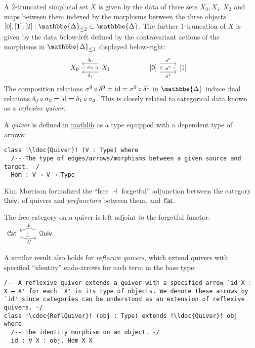 \documentclass[a4paper,UKenglish,cleveref, autoref, thm-restate]{lipics-v2021}
\newcommand{\id}{\textup{id}}
\newcommand{\cat}[1]{\textup{\textsf{#1}}}%
\newcommand{\1}{\mathbbe{1}}
\newcommand{\2}{\mathbbe{2}}
\newcommand{\3}{\mathbbe{3}}
\newcommand{\DDelta}{\mathbbe{\Delta}}
\newcommand{\Cat}{\mathcal{C}{\kern-.75pt}\cat{at}}
\newcommand{\Quiv}{\mathcal{Q}\cat{uiv}}
\newcommand{\libmathlib}{\href{https://github.com/leanprover-community/mathlib}{\textsf{mathlib}}}
\newcommand{\ldoc}[2][]{\href{https://leanprover-community.github.io/mathlib4_docs/find/?pattern=#1#2\#doc}{\texttt{#2}}}
\newcommand{\cdoc}[2][]{\href{https://leanprover-community.github.io/mathlib4_docs/find/?pattern=CategoryTheory.#1#2\#doc}{\texttt{#2}}}
\begin{document}
A 2-truncated simplicial set $X$ is given by the data of three sets $X_0, X_1, X_2$ and maps between them indexed by the morphisms between the three objects $[0], [1], [2] : \DDelta_{\leq 2} \subset \DDelta$. The further 1-truncation of $X$  is given by the data below-left defined by the contravariant actions of the morphisms in $\DDelta_{\leq 1}$ displayed below-right:
\begin{equation}\label{eq:underlying-refl-quiv} \begin{tikzcd} X_0 \arrow[r, "\sigma_0" description] & X_1 \arrow[l, shift left=.6em, "\delta_1"] \arrow[l, shift right=.6em, "\delta_0"']  & & {[0]} \arrow[r, shift left=.6em, "\delta^0"] \arrow[r, shift right=.6em, "\delta^1"'] & {[1]} \arrow[l, "\sigma^0" description] \end{tikzcd}
\end{equation}
The composition relations    $\sigma^0 \circ \delta^0 = \id = \sigma^0 \circ \delta^1$ in $\DDelta$ induce dual relations $\delta_0 \circ \sigma_0 = \id = \delta_1 \circ \sigma_0$.  This is closely related to categorical data known as a \emph{reflexive quiver}.

A \emph{quiver} is defined in \libmathlib{} as a type equipped with a dependent type of arrows:
\begin{lstlisting}
class !\ldoc{Quiver}! (V : Type) where
  /-- The type of edges/arrows/morphisms between a given source and target. -/
  Hom : V → V → Type
\end{lstlisting}
Kim Morrison formalized the ``free $\dashv$ forgetful'' adjunction between the category $\Quiv$, of quivers and \emph{prefunctors} between them, and $\Cat$.

\begin{proposition}[\cdoc{Quiv.adj}]\label{prop:quiv-adj}
  The free category on a quiver is left adjoint to the forgetful functor:
  $ \begin{tikzcd} \Cat \arrow[r, bend right=20, "U"' pos=.6] \arrow[r, phantom, "\bot"] & \Quiv\,. \arrow[l, bend right=20, "F"' pos=.4] \end{tikzcd} $
\end{proposition}

A similar result also holds for \emph{reflexive quivers}, which extend quivers with specified ``identity'' endo-arrows for each term in the base type:
\begin{lstlisting}
/-- A reflexive quiver extends a quiver with a specified arrow `id X : X ⟶ X' for each `X' in its type of objects. We denote these arrows by `id' since categories can be understood as an extension of reflexive quivers. -/
class !\cdoc{ReflQuiver}! (obj : Type) extends !\ldoc{Quiver}! obj where
  /-- The identity morphism on an object. -/
  id : ∀ X : obj, Hom X X
\end{lstlisting}
\end{document}
